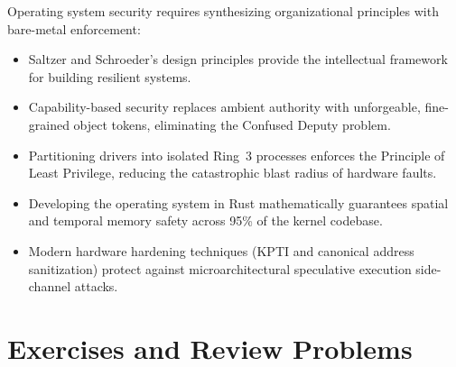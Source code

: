 Operating system security requires synthesizing organizational principles with bare-metal enforcement:
\begin{itemize}
    \item Saltzer and Schroeder's design principles provide the intellectual framework for building resilient systems.
    \item Capability-based security replaces ambient authority with unforgeable, fine-grained object tokens, eliminating the Confused Deputy problem.
    \item Partitioning drivers into isolated Ring~3 processes enforces the Principle of Least Privilege, reducing the catastrophic blast radius of hardware faults.
    \item Developing the operating system in Rust mathematically guarantees spatial and temporal memory safety across 95\% of the kernel codebase.
    \item Modern hardware hardening techniques (KPTI and canonical address sanitization) protect against microarchitectural speculative execution side-channel attacks.
\end{itemize}

\section{Exercises and Review Problems}
\label{sec:exercises_chap8}

